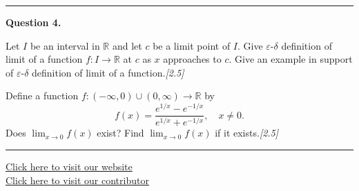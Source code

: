 \documentclass[11pt,a4paper]{article}
\newcommand{\pts}[1]{\hfill\textit{[#1]}}
\begin{document}
\medskip\rule{\linewidth}{0.2pt}\medskip

\noindent\textbf{Question 4.}
\begin{parts}
  \item Let $I$ be an interval in $\mathbb{R}$ and let $c$ be a limit point of $I$. Give $\varepsilon$-$\delta$ definition of limit of a function $f : I \to \mathbb{R}$ at $c$ as $x$ approaches to $c$. Give an example in support of $\varepsilon$-$\delta$ definition of limit of a function.\pts{2.5}
  \item Define a function $f : (-\infty, 0) \cup (0, \infty) \to \mathbb{R}$ by
  \[
    f(x) = \frac{e^{1/x} - e^{-1/x}}{e^{1/x} + e^{-1/x}}, \quad x \neq 0.
  \]
  Does $\lim_{x \to 0} f(x)$ exist? Find $\lim_{x \to 0} f(x)$ if it exists.\pts{2.5}
\end{parts}

\vfill
\rule{\linewidth}{0.4pt}
\begin{center}\small
\href{https://bhu-exam.vercel.app/}{Click here to visit our website}\\[4pt]
\href{https://me-aryan.vercel.app/}{Click here to visit our contributor}
\end{center}
\end{document}
